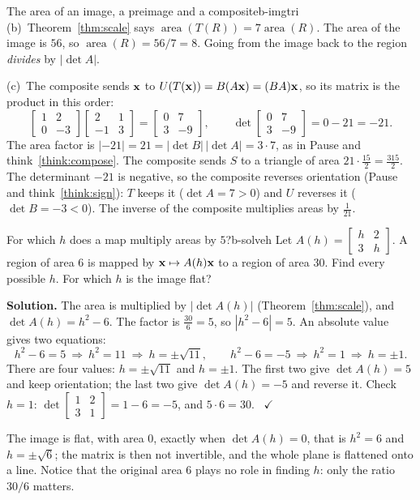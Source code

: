 \documentclass[11pt]{article}
\begin{document}
\begin{exmp}{The area of an image, a preimage and a composite}{b-imgtri}
(b)~Theorem~\ref{thm:scale} says $\operatorname{area}(T(R))=7\operatorname{area}(R)$. The area of the image is $56$, so $\operatorname{area}(R)=56/7=8$. Going from the image back to the region \emph{divides} by $|\det A|$.

(c)~The composite sends $\mathbf{x}$ to $U(T(\mathbf{x}))=B(A\mathbf{x})=(BA)\mathbf{x}$, so its matrix is the product in this order:
\[
\begin{bmatrix}1&2\\0&-3\end{bmatrix}\begin{bmatrix}2&1\\-1&3\end{bmatrix}=\begin{bmatrix}0&7\\3&-9\end{bmatrix},\qquad\det\begin{bmatrix}0&7\\3&-9\end{bmatrix}=0-21=-21.
\]
The area factor is $|-21|=21=|\det B|\,|\det A|=3\cdot7$, as in Pause and think~\ref{think:compose}. The composite sends $S$ to a triangle of area $21\cdot\tfrac{15}2=\tfrac{315}2$. The determinant $-21$ is negative, so the composite reverses orientation (Pause and think~\ref{think:sign}): $T$ keeps it ($\det A=7>0$) and $U$ reverses it ($\det B=-3<0$). The inverse of the composite multiplies areas by $\tfrac1{21}$.
\end{exmp}

\begin{exmp}{For which $h$ does a map multiply areas by $5$?}{b-solveh}
Let $A(h)=\begin{bmatrix}h&2\\3&h\end{bmatrix}$. A region of area $6$ is mapped by $\mathbf{x}\mapsto A(h)\mathbf{x}$ to a region of area $30$. Find every possible $h$. For which $h$ is the image flat?

\textbf{Solution.} The area is multiplied by $|\det A(h)|$ (Theorem~\ref{thm:scale}), and $\det A(h)=h^2-6$. The factor is $\frac{30}6=5$, so $|h^2-6|=5$. An absolute value gives two equations:
\[
h^2-6=5\ \Rightarrow\ h^2=11\ \Rightarrow\ h=\pm\sqrt{11},\qquad
h^2-6=-5\ \Rightarrow\ h^2=1\ \Rightarrow\ h=\pm1.
\]
There are four values: $h=\pm\sqrt{11}$ and $h=\pm1$. The first two give $\det A(h)=5$ and keep orientation; the last two give $\det A(h)=-5$ and reverse it. Check $h=1$: $\det\begin{bmatrix}1&2\\3&1\end{bmatrix}=1-6=-5$, and $5\cdot6=30$. \ $\checkmark$

The image is flat, with area $0$, exactly when $\det A(h)=0$, that is $h^2=6$ and $h=\pm\sqrt6$; the matrix is then not invertible, and the whole plane is flattened onto a line. Notice that the original area $6$ plays no role in finding $h$: only the ratio $30/6$ matters.
\end{exmp}
\end{document}

